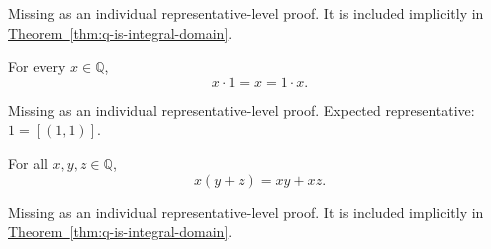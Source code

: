 \begin{remark*}[Status]
Missing as an individual representative-level proof. It is included implicitly in \hyperref[thm:q-is-integral-domain]{Theorem~\ref*{thm:q-is-integral-domain}}.
\end{remark*}

\begin{tcolorbox}[colback=thmbox, colframe=thmborder, arc=2pt,
  left=6pt, right=6pt, top=4pt, bottom=4pt,
  title={\small\textbf{Theorem (Rational Multiplicative Identity)}},
  fonttitle=\small\bfseries]
\begin{theorem}
\label{thm:rational-multiplicative-identity}
For every $x\in\mathbb{Q}$,
\[
x\cdot 1=x=1\cdot x.
\]
\end{theorem}
\end{tcolorbox}

\begin{remark*}[Status]
Missing as an individual representative-level proof. Expected representative: $1=[(1,1)]$.
\end{remark*}

\begin{tcolorbox}[colback=thmbox, colframe=thmborder, arc=2pt,
  left=6pt, right=6pt, top=4pt, bottom=4pt,
  title={\small\textbf{Theorem (Rational Distributivity)}},
  fonttitle=\small\bfseries]
\begin{theorem}
\label{thm:rational-distributivity}
For all $x,y,z\in\mathbb{Q}$,
\[
x(y+z)=xy+xz.
\]
\end{theorem}
\end{tcolorbox}

\begin{remark*}[Status]
Missing as an individual representative-level proof. It is included implicitly in \hyperref[thm:q-is-integral-domain]{Theorem~\ref*{thm:q-is-integral-domain}}.
\end{remark*}
